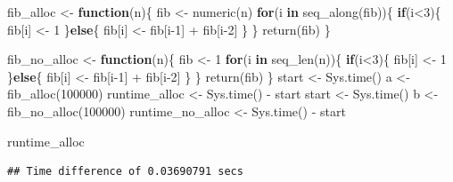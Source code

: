 \documentclass[
]{book}
\newenvironment{Shaded}{\begin{snugshade}}{\end{snugshade}}
\newcommand{\ControlFlowTok}[1]{\textcolor[rgb]{0.13,0.29,0.53}{\textbf{#1}}}
\newcommand{\DecValTok}[1]{\textcolor[rgb]{0.00,0.00,0.81}{#1}}
\newcommand{\FunctionTok}[1]{\textcolor[rgb]{0.00,0.00,0.00}{#1}}
\newcommand{\NormalTok}[1]{#1}
\newcommand{\OtherTok}[1]{\textcolor[rgb]{0.56,0.35,0.01}{#1}}
\newcommand{\SpecialCharTok}[1]{\textcolor[rgb]{0.00,0.00,0.00}{#1}}
\begin{document}
\begin{Shaded}
\begin{Highlighting}[]
\NormalTok{fib\_alloc }\OtherTok{\textless{}{-}} \ControlFlowTok{function}\NormalTok{(n)\{}
\NormalTok{  fib }\OtherTok{\textless{}{-}} \FunctionTok{numeric}\NormalTok{(n)}
  \ControlFlowTok{for}\NormalTok{(i }\ControlFlowTok{in} \FunctionTok{seq\_along}\NormalTok{(fib))\{}
    \ControlFlowTok{if}\NormalTok{(i}\SpecialCharTok{\textless{}}\DecValTok{3}\NormalTok{)\{ }
\NormalTok{      fib[i] }\OtherTok{\textless{}{-}} \DecValTok{1}
\NormalTok{    \}}\ControlFlowTok{else}\NormalTok{\{}
\NormalTok{      fib[i] }\OtherTok{\textless{}{-}}\NormalTok{ fib[i}\DecValTok{{-}1}\NormalTok{] }\SpecialCharTok{+}\NormalTok{ fib[i}\DecValTok{{-}2}\NormalTok{] }
\NormalTok{    \}}
\NormalTok{  \}}
  \FunctionTok{return}\NormalTok{(fib)}
\NormalTok{\}}


\NormalTok{fib\_no\_alloc }\OtherTok{\textless{}{-}} \ControlFlowTok{function}\NormalTok{(n)\{}
\NormalTok{  fib }\OtherTok{\textless{}{-}} \DecValTok{1}
  \ControlFlowTok{for}\NormalTok{(i }\ControlFlowTok{in} \FunctionTok{seq\_len}\NormalTok{(n))\{}
    \ControlFlowTok{if}\NormalTok{(i}\SpecialCharTok{\textless{}}\DecValTok{3}\NormalTok{)\{ }
\NormalTok{      fib[i] }\OtherTok{\textless{}{-}} \DecValTok{1}
\NormalTok{    \}}\ControlFlowTok{else}\NormalTok{\{}
\NormalTok{      fib[i] }\OtherTok{\textless{}{-}}\NormalTok{ fib[i}\DecValTok{{-}1}\NormalTok{] }\SpecialCharTok{+}\NormalTok{ fib[i}\DecValTok{{-}2}\NormalTok{] }
\NormalTok{    \}}
\NormalTok{  \}}
  \FunctionTok{return}\NormalTok{(fib)}
\NormalTok{\}}
\NormalTok{start }\OtherTok{\textless{}{-}} \FunctionTok{Sys.time}\NormalTok{()}
\NormalTok{a }\OtherTok{\textless{}{-}} \FunctionTok{fib\_alloc}\NormalTok{(}\DecValTok{100000}\NormalTok{)}
\NormalTok{runtime\_alloc }\OtherTok{\textless{}{-}} \FunctionTok{Sys.time}\NormalTok{() }\SpecialCharTok{{-}}\NormalTok{ start}
\NormalTok{start }\OtherTok{\textless{}{-}} \FunctionTok{Sys.time}\NormalTok{()}
\NormalTok{b }\OtherTok{\textless{}{-}} \FunctionTok{fib\_no\_alloc}\NormalTok{(}\DecValTok{100000}\NormalTok{)}
\NormalTok{runtime\_no\_alloc }\OtherTok{\textless{}{-}} \FunctionTok{Sys.time}\NormalTok{() }\SpecialCharTok{{-}}\NormalTok{ start}

\NormalTok{runtime\_alloc}
\end{Highlighting}
\end{Shaded}

\begin{verbatim}
## Time difference of 0.03690791 secs
\end{verbatim}
\end{document}

